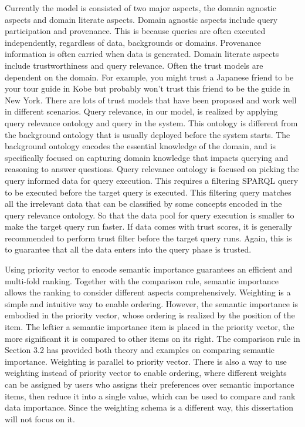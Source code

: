 Currently the model is consisted of two major aspects, the domain agnostic aspects and domain literate aspects. 
Domain agnostic aspects include query participation and provenance.
This is because queries are often executed independently, regardless of data, backgrounds or domains. 
Provenance information is often carried when data is generated. 
Domain literate aspects include trustworthiness and query relevance.
Often the trust models are dependent on the domain. 
For example, you might trust a Japanese friend to be your tour guide in Kobe but probably won't trust this friend to be the guide in New York.
There are lots of trust models that have been proposed and work well in different scenarios. 
Query relevance, in our model, is realized by applying query relevance ontology and query in the system. 
This ontology is different from the background ontology that is usually deployed before the system starts.
The background ontology encodes the essential knowledge of the domain, and is specifically focused on capturing domain knowledge that impacts querying and reasoning to answer questions. 
Query relevance ontology is focused on picking the query informed data for query execution. 
This requires a filtering SPARQL query to be executed before the target query is executed.
This filtering query matches all the irrelevant data that can be classified by some concepts encoded in the query relevance ontology. 
So that the data pool for query execution is smaller to make the target query run faster. 
If data comes with trust scores, it is generally recommended to perform trust filter before the target query runs. 
Again, this is to guarantee that all the data enters into the query phase is trusted.

Using priority vector to encode semantic importance guarantees an efficient and multi-fold ranking.
Together with the comparison rule, semantic importance allows the ranking to consider different aspects comprehensively.
Weighting is a simple and intuitive way to enable ordering. However, the semantic importance is embodied in the priority vector, whose ordering is realized by the position of the item. The leftier a semantic importance item is placed in the priority vector, the more significant it is compared to other items on its right. The comparison rule in Section 3.2 has provided both theory and examples on comparing semantic importance. Weighting is parallel to priority vector. There is also a way to use weighting instead of priority vector to enable ordering, where different weights can be assigned by users who assigns their preferences over semantic importance items, then reduce it into a single value, which can be used to compare and rank data importance. Since the weighting schema is a different way, this dissertation will not focus on it. 

